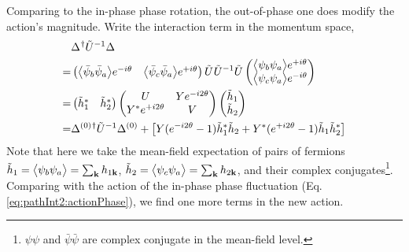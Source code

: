 Comparing to the in-phase phase rotation, the out-of-phase one does modify the action's magnitude. Write the interaction term in the momentum space,
\begin{align*}
&\Delta^{}{}^{\dagger}\tilde{U}^{-1}\Delta^{}\\
=&\begin{pmatrix}\bigl<{\bar{\psi}_{b}\bar{\psi}_{a}}\bigr>e^{-i\theta}&\bigl<{\bar{\psi}_{c}\bar{\psi}_{a}}\bigr>e^{+i\theta}\end{pmatrix}\tilde{U}^{}\tilde{U}^{-1}\tilde{U}
\begin{pmatrix}\bigl<{\psi_{b}\psi_{a}}\bigr>e^{+i\theta}\\\bigl<{\psi_{c}\psi_{a}}\bigr>e^{-i\theta}\end{pmatrix}\\
=&\begin{pmatrix}\tilde{h}_{1}^{*}&\tilde{h}_{2}^{*}\end{pmatrix}\begin{pmatrix}U&Ye^{-i2\theta}\\Y^{*}e^{+i2\theta}&V\end{pmatrix}\begin{pmatrix}\tilde{h}_{1}\\\tilde{h}_{2}\end{pmatrix}\\
=&\Delta^{(0)}{}^{\dagger}\tilde{U}^{-1}\Delta^{(0)}
+\left[Y(e^{-i2\theta}-1)\tilde{h}_{1}^{*}\tilde{h}_{2} +Y^{*}(e^{+i2\theta}-1)\tilde{h}_{1}\tilde{h}_{2}^{*}\right]
\end{align*}
Note that here we take the mean-field expectation of pairs of fermions $\tilde{h}_{1}=\bigl<{\psi_{b}\psi_{a}}\bigr>=\sum_{\mathbf{k}}h_{1\mathbf{k}}$, $\tilde{h}_{2}=\bigl<{\psi_{c}\psi_{a}}\bigr>=\sum_{\mathbf{k}}h_{2\mathbf{k}}$, and their complex conjugates\footnote{$\psi\psi$ and $\bar\psi\bar\psi$ are complex conjugate in the mean-field level.}.  Comparing with the action of the in-phase phase fluctuation (Eq. \ref{eq:pathInt2:actionPhase}), we find one more terms in the new action.  
